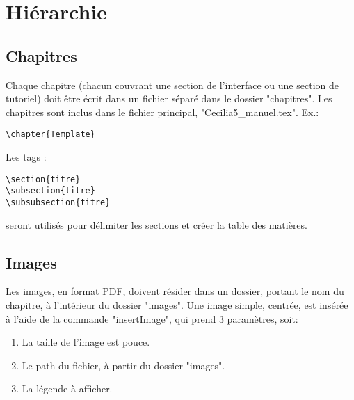 \section{Hiérarchie}

\subsection{Chapitres}

Chaque chapitre (chacun couvrant une section de l'interface ou une section de tutoriel) doit être écrit dans un fichier séparé dans le dossier "chapitres".
Les chapitres sont inclus dans le fichier principal, "Cecilia5\_manuel.tex". Ex.:

\begin{verbatim}
\chapter{Template}

\end{verbatim}

\noindent
Les tags :

\begin{verbatim}
\section{titre}
\subsection{titre}
\subsubsection{titre}
\end{verbatim}

\noindent
seront utilisés pour délimiter les sections et créer la table des matières.

\subsection{Images}

Les images, en format PDF, doivent résider dans un dossier, portant le nom du chapitre, à l'intérieur du dossier "images".
Une image simple, centrée, est insérée à l'aide de la commande "insertImage", qui prend 3 paramètres, soit:

\begin{enumerate}
    \item La taille de l'image est pouce.
    \item Le path du fichier, à partir du dossier "images".
    \item La légende à afficher.
\end{enumerate}

